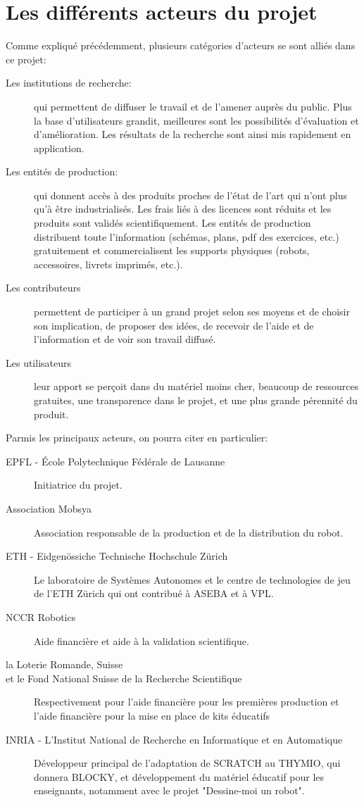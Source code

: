 \documentclass[a4paper, 12pt]{report}
\begin{document}
\section{Les différents acteurs du projet}
Comme expliqué précédemment, plusieurs catégories d'acteurs se sont alliés dans ce projet:
\begin{description}
\item[Les institutions de recherche: ]qui permettent de diffuser le travail et de l'amener auprès du public. Plus la base d'utilisateurs grandit, meilleures sont les possibilités d'évaluation et d'amélioration. Les résultats de la recherche sont ainsi mis rapidement en application.
\item[Les entités de production: ] qui donnent accès à des produits proches de l'état de l'art qui n'ont plus qu'à être industrialisés. Les frais liés à des licences sont réduits et les produits sont validés scientifiquement. Les entités de production distribuent toute l'information (schémas, plans, pdf des exercices, etc.) gratuitement et commercialisent les supports physiques (robots, accessoires, livrets imprimés, etc.).
\item[Les contributeurs] permettent de participer à un grand projet selon ses moyens et de choisir son implication, de proposer des idées, de recevoir de l'aide et de l'information et de voir son travail diffusé.
\item[Les utilisateurs] leur apport se perçoit dans du matériel moins cher, beaucoup de ressources gratuites, une transparence dans le projet, et une plus grande pérennité du produit.
\end{description}

Parmis les principaux acteurs, on pourra citer en particulier:
\begin{description}
\item[EPFL - École Polytechnique Fédérale de Lausanne] Initiatrice du projet.
\item[Association Mobsya] Association responsable de la production et de la distribution du robot.
\item[ETH - Eidgenössiche Technische Hochschule Zürich] Le laboratoire de Systèmes Autonomes et le centre de technologies de jeu de l'ETH Zürich qui ont contribué à ASEBA et à VPL.
\item[NCCR Robotics] Aide financière et aide à la validation scientifique.
\item[la Loterie Romande, Suisse]
\item[et le Fond National Suisse de la Recherche Scientifique] Respectivement pour l'aide financière pour les premières production et l'aide financière pour la mise en place de kits éducatifs
\item[INRIA - L'Institut National de Recherche en Informatique et en Automatique] Développeur principal de l'adaptation de SCRATCH au THYMIO, qui donnera BLOCKY, et développement du matériel éducatif pour les enseignants, notamment avec le projet "Dessine-moi un robot". 
\end{description} 
\end{document}
